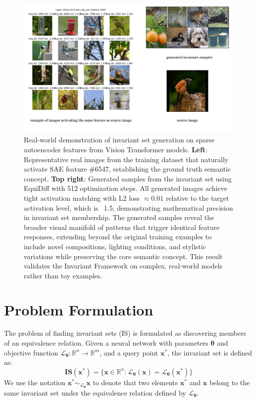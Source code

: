 \begin{figure}[h]
\centering
\includegraphics[width=\linewidth]{figures/main/experiment1.2.pdf}
\caption{Real-world demonstration of invariant set generation on sparse autoencoder features from Vision Transformer models. \textbf{Left}: Representative real images from the training dataset that naturally activate SAE feature \#6547, establishing the ground truth semantic concept. \textbf{Top right}: Generated samples from the invariant set using EquiDiff with 512 optimization steps. All generated images achieve tight activation matching with L2 loss $\approx 0.01$ relative to the target activation level, which is ~1.5, demonstrating mathematical precision in invariant set membership. The generated samples reveal the broader visual manifold of patterns that trigger identical feature responses, extending beyond the original training examples to include novel compositions, lighting conditions, and stylistic variations while preserving the core semantic concept. This result validates the Invariant Framework on complex, real-world models rather than toy examples.}
\label{fig:method_sae_demo}
\end{figure}

\section{Problem Formulation}
The problem of finding invariant sets (IS) is formulated as discovering members of an equivalence relation. Given a neural network with parameters $\boldsymbol{\theta}$ and objective function $\mathcal{L}_{\boldsymbol{\theta}}:\mathbb{R}^n \rightarrow \mathbb{R}^m$, and a query point $\mathbf{x^*}$, the invariant set is defined as:
\begin{equation}
  \mathbf{IS}(\mathbf{x^*}) = \{ \mathbf{x} \in \mathbb{R}^n : \mathcal{L}_{\boldsymbol{\theta}}(\mathbf{x}) = \mathcal{L}_{\boldsymbol{\theta}}(\mathbf{x^*}) \}
  \label{eq:is}
\end{equation}
We use the notation $\mathbf{x^*} \sim_{\mathcal{L}_{\boldsymbol{\theta}}} \mathbf{x}$ to denote that two elements $\mathbf{x^*}$ and $\mathbf{x}$ belong to the same invariant set under the equivalence relation defined by $\mathcal{L}_{\boldsymbol{\theta}}$.

